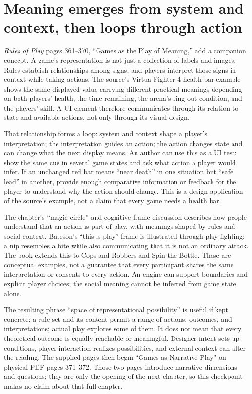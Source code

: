 \section{Meaning emerges from system and context, then loops through action}\label{06-engine-ii-ch046-meaning-emerges-from-system-and-context-then-loops-through-action}

\hypertarget{06-engine-ii-ch046-meaning-emerges-from-system-and-context-then-loops-through-action}{}

\emph{Rules of Play} pages 361--370, ``Games as the Play of Meaning,'' add a companion concept. A game's representation is not just a collection of labels and images. Rules establish relationships among signs, and players interpret those signs in context while taking actions. The source's Virtua Fighter 4 health-bar example shows the same displayed value carrying different practical meanings depending on both players' health, the time remaining, the arena's ring-out condition, and the players' skill. A UI element therefore communicates through its relation to state and available actions, not only through its visual design.

That relationship forms a loop: system and context shape a player's interpretation; the interpretation guides an action; the action changes state and can change what the next display means. An author can use this as a UI test: show the same cue in several game states and ask what action a player would infer. If an unchanged red bar means ``near death'' in one situation but ``safe lead'' in another, provide enough comparative information or feedback for the player to understand why the action should change. This is a design application of the source's example, not a claim that every game needs a health bar.

The chapter's ``magic circle'' and cognitive-frame discussion describes how people understand that an action is part of play, with meanings shaped by rules and social context. Bateson's ``this is play'' frame is illustrated through play-fighting: a nip resembles a bite while also communicating that it is not an ordinary attack. The book extends this to Cops and Robbers and Spin the Bottle. These are conceptual examples, not a guarantee that every participant shares the same interpretation or consents to every action. An engine can support boundaries and explicit player choices; the social meaning cannot be inferred from game state alone.

The resulting phrase ``space of representational possibility'' is useful if kept concrete: a rule set and its content permit a range of actions, outcomes, and interpretations; actual play explores some of them. It does not mean that every theoretical outcome is equally reachable or meaningful. Designer intent sets up conditions, player interaction realizes possibilities, and external context can alter the reading. The supplied pages then begin ``Games as Narrative Play'' on physical PDF pages 371--372. Those two pages introduce narrative dimensions and questions; they are only the opening of the next chapter, so this checkpoint makes no claim about that full chapter.

